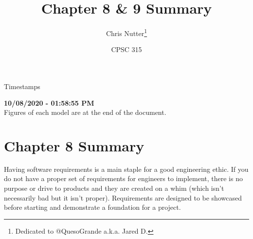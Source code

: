 \documentclass[12pt]{article}
\title{Chapter 8 \& 9 Summary}
\author{Chris Nutter\thanks{Dedicated to @QuesoGrande a.k.a. Jared D.}}
\date{CPSC 315}
\renewcommand{\abstractname}{\small{\begin{center}Timestamps\end{center}\vspace{-4ex}}}
\begin{document}
\maketitle


\noindent\abstractname
\begin{center}
    \normalsize\textbf{10/08/2020 - 01:58:55 PM}\\
    Figures of each model are at the end of the document.
\end{center}
\normalsize

\tableofcontents    
\vspace{4ex}


\section{Chapter 8 Summary}
    \indent Having software requirements is a main staple for a good engineering ethic. If you do not have a proper set of requirements for engineers to implement, there is no purpose or drive to products and they are created on a whim (which isn't necessarily bad but it isn't proper). Requirements are designed to be showcased before starting and demonstrate a foundation for a project.  
\end{document}
